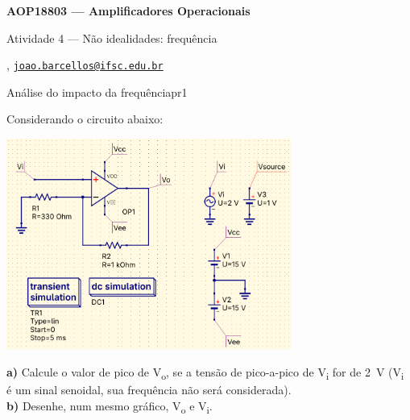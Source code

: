 



\usepackage[style=numeric, citestyle=ieee]{biblatex}




\begin{Large}
    \textbf{AOP18803 --- Amplificadores Operacionais}
    
    Atividade 4 --- Não idealidades: frequência \hfill {}
\end{Large}

\vspace{1ex}
\textbf{} , \href{mailto:joao.barcellos@ifsc.edu.br}{\texttt{joao.barcellos@ifsc.edu.br}}\\
\textbf{}

\vspace{2ex}

\begin{problem}{Análise do impacto da frequência}{pr1}

Considerando o circuito abaixo: \\
    
\begin{center}
    \includegraphics[width=0.7\textwidth]{./figures/freq_test.png}
\end{center}

\textbf{a)} Calcule o valor de pico de V\textsubscript{o}, se a tensão de pico-a-pico de V\textsubscript{i} for de \SI{2}{\volt} (V\textsubscript{i} é um sinal senoidal, sua frequência não será considerada). \\

\textbf{b)} Desenhe, num mesmo gráfico, V\textsubscript{o} e V\textsubscript{i}. \\

\end{problem}

